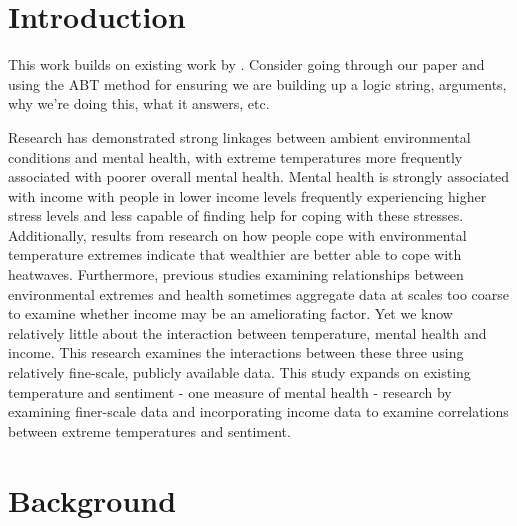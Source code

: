 \documentclass{article}
\begin{document}
    

\section{Introduction}



This work builds on existing work by \citep{baylis_weather_2018}. 
Consider going through our paper and using the ABT method for ensuring we are building up a logic string, arguments, why we're doing this, what it answers, etc.

Research has demonstrated strong linkages between ambient environmental conditions and mental health, with extreme temperatures more frequently associated with poorer overall mental health. Mental health is strongly associated with income with people in lower income levels frequently experiencing higher stress levels and less capable of finding help for coping with these stresses. Additionally, results from research on how people cope with environmental temperature extremes indicate that wealthier are better able to cope with heatwaves. Furthermore, previous studies examining relationships between environmental extremes and health sometimes aggregate data at scales too coarse to examine whether income may be an ameliorating factor. Yet we know relatively little about the interaction between temperature, mental health and income. This research examines the interactions between these three using relatively fine-scale, publicly available data. This study expands on existing temperature and sentiment - one measure of mental health - research by examining finer-scale data and incorporating income data to examine correlations between extreme temperatures and sentiment.

\section{Background}
\end{document}
